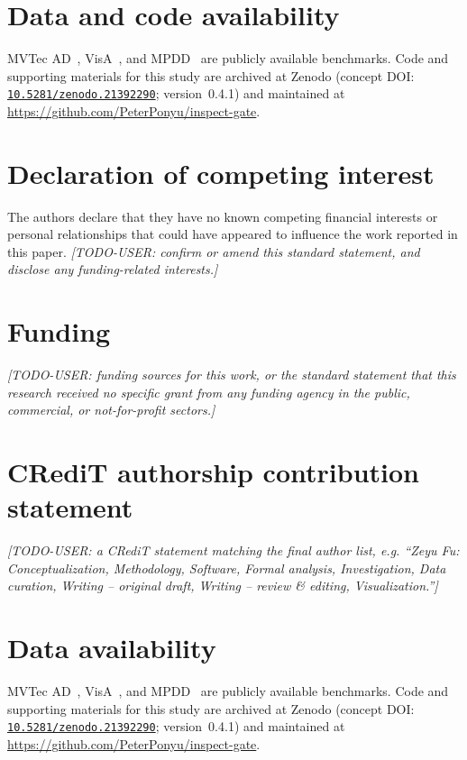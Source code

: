 \documentclass[preprint,11pt]{elsarticle}
\newcommand{\userfill}[1]{\textit{[TODO-USER: #1]}}
\begin{document}
\section*{Data and code availability}
MVTec AD~\citep{bergmann2019mvtec}, VisA~\citep{zou2022spot}, and
MPDD~\citep{jezek2021mpdd} are publicly available benchmarks. Code and supporting materials
for this study are archived at Zenodo (concept DOI:
\href{https://doi.org/10.5281/zenodo.21392290}{\texttt{10.5281/zenodo.21392290}};
version~0.4.1) and maintained at \url{https://github.com/PeterPonyu/inspect-gate}.

\section*{Declaration of competing interest}
The authors declare that they have no known competing financial interests or personal relationships
that could have appeared to influence the work reported in this paper.
\userfill{confirm or amend this standard statement, and disclose any funding-related interests.}

\section*{Funding}
\userfill{funding sources for this work, or the standard statement that this research received no
specific grant from any funding agency in the public, commercial, or not-for-profit sectors.}

\section*{CRediT authorship contribution statement}
\userfill{a CRediT statement matching the final author list, e.g. ``Zeyu Fu: Conceptualization,
Methodology, Software, Formal analysis, Investigation, Data curation, Writing -- original draft,
Writing -- review \& editing, Visualization.''}

\section*{Data availability}
MVTec AD~\citep{bergmann2019mvtec}, VisA~\citep{zou2022spot}, and
MPDD~\citep{jezek2021mpdd} are publicly available benchmarks. Code and supporting materials
for this study are archived at Zenodo (concept DOI:
\href{https://doi.org/10.5281/zenodo.21392290}{\texttt{10.5281/zenodo.21392290}};
version~0.4.1) and maintained at \url{https://github.com/PeterPonyu/inspect-gate}.



\end{document}

